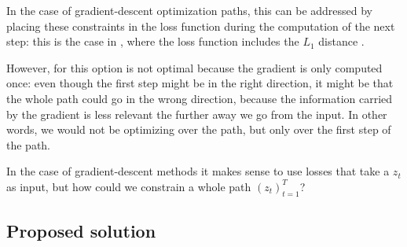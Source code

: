 \documentclass[../main.tex]{subfiles}
\begin{document}
In the case of gradient-descent optimization paths, this can be addressed by placing these constraints in the loss function during the computation of the next step: this is the case in \revise{}, where the loss function includes the $L_1$ distance \cite{joshiRealistic2019}.

However, for \ls{} this option is not optimal because the gradient is only computed once: even though the first step might be in the right direction, it might be that the whole path could go in the wrong direction, because the information carried by the gradient is less relevant the further away we go from the input.
In other words, we would not be optimizing over the path, but only over the first step of the path.

In the case of gradient-descent methods it makes sense to use losses that take a $z_t$ as input, but how could we constrain a whole path $(z_t)_{t=1}^T$?

\subsection{Proposed solution}
\end{document}

